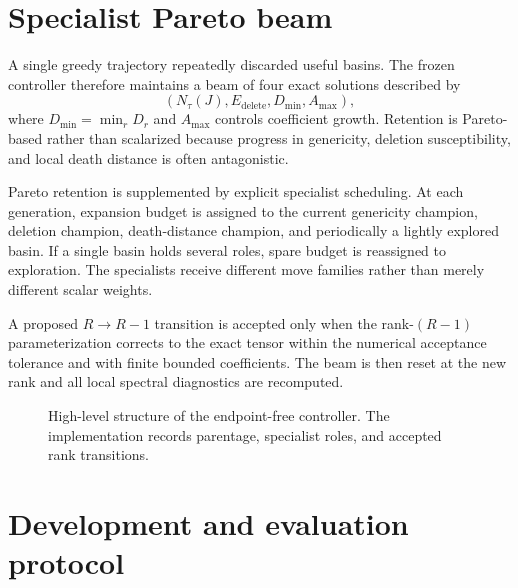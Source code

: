 \documentclass[11pt]{article}
\begin{document}
\section{Specialist Pareto beam}

A single greedy trajectory repeatedly discarded useful basins.  The frozen controller therefore maintains a beam of four exact solutions described by
\begin{equation}
\left(N_\tau(J),E_{\mathrm{delete}},D_{\min},A_{\max}\right),
\end{equation}
where $D_{\min}=\min_r D_r$ and $A_{\max}$ controls coefficient growth.  Retention is Pareto-based rather than scalarized because progress in genericity, deletion susceptibility, and local death distance is often antagonistic.

Pareto retention is supplemented by explicit specialist scheduling.  At each generation, expansion budget is assigned to the current genericity champion, deletion champion, death-distance champion, and periodically a lightly explored basin.  If a single basin holds several roles, spare budget is reassigned to exploration.  The specialists receive different move families rather than merely different scalar weights.

A proposed $R\to R-1$ transition is accepted only when the rank-$(R-1)$ parameterization corrects to the exact tensor within the numerical acceptance tolerance and with finite bounded coefficients.  The beam is then reset at the new rank and all local spectral diagnostics are recomputed.

\begin{figure}[t]
\centering
{}
\caption{High-level structure of the endpoint-free controller.  The implementation records parentage, specialist roles, and accepted rank transitions.}
\label{fig:controller}
\end{figure}

\section{Development and evaluation protocol}
\end{document}
